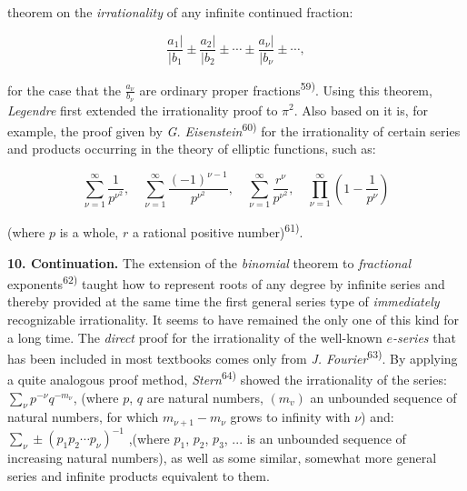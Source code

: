 \thispagestyle{fancy}

\vspace{0.5cm}

theorem on the \textit{irrationality} of any infinite continued fraction:

\vspace{-0.2cm}
$$\frac{a_1 |}{| b_1} \pm \frac{a_2 |}{| b_2} \pm \cdots \pm \frac{a_\nu |}{| b_\nu} \pm\cdots ,$$
\vspace{-0.2cm}

for the case that the $\frac{a_\nu}{b_\nu}$ are ordinary proper fractions\textsuperscript{59)}. Using this theorem, \textit{Legendre} first extended the irrationality proof to $\pi^2$. Also based on it is, for example, the proof given by \textit{G. Eisenstein}\textsuperscript{60)} for the irrationality of certain series and products occurring in the theory of elliptic functions, such as:

\vspace{-0.2cm}
$$\sum_{\nu=1}^{\infty} \frac{1}{p^{\nu^2}}, \quad \sum_{\nu=1}^{\infty} \frac{(-1)^{\nu - 1}}{p^{\nu^2}}, \quad \sum_{\nu=1}^{\infty} \frac{r^{\nu}}{p^{\nu^2}}, \quad \prod_{\nu=1}^{\infty} (1 - \frac{1}{p^{\nu}})$$
\vspace{-0.2cm}

(where $p$ is a whole, $r$ a rational positive number)\textsuperscript{61)}.

\vspace{0.3cm}
\textbf{10. Continuation.} The extension of the \textit{binomial} theorem to \textit{fractional} exponents\textsuperscript{62)} taught how to represent roots of any degree by infinite series and thereby provided at the same time the first general series type of \textit{immediately} recognizable irrationality. It seems to have remained the only one of this kind for a long time. The \textit{direct} proof for the irrationality of the well-known \textit{$e$-series} that has been included in most textbooks comes only from \textit{J. Fourier}\textsuperscript{63)}. By applying a quite analogous proof method, \textit{Stern}\textsuperscript{64)} showed the irrationality of the series: $\sum_{\nu} p^{-\nu} q^{-m_\nu}$, (where $p$, $q$ are natural numbers, $(m_v)$ an unbounded sequence of natural numbers, for which $m_{\nu+1} - m_\nu$ grows to infinity with $\nu$) and: $\sum_{\nu} \pm (p_1 p_2 \cdots p_\nu)^{-1}$ ,(where $p_1$, $p_2$, $p_3$, ... is an unbounded sequence of increasing natural numbers), as well as some similar, somewhat more general series and infinite products equivalent to them.

